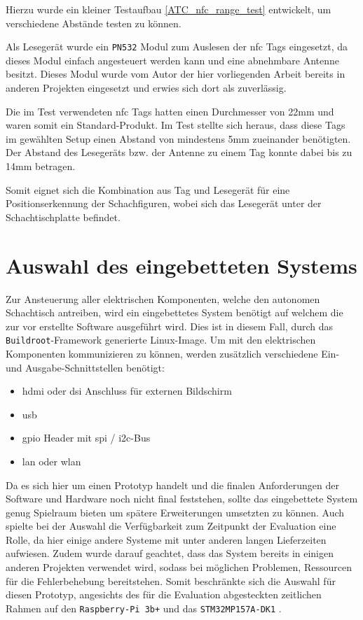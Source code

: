 Hierzu wurde ein kleiner Testaufbau \ref{ATC_nfc_range_test} entwickelt,
um verschiedene Abstände testen zu können.

Als Lesegerät wurde ein \passthrough{\lstinline!PN532!} Modul zum
Auslesen der \gls{nfc} Tags eingesetzt, da dieses Modul einfach
angesteuert werden kann und eine abnehmbare Antenne besitzt. Dieses
Modul wurde vom Autor der hier vorliegenden Arbeit bereits in anderen
Projekten eingesetzt und erwies sich dort als zuverlässig.

Die im Test verwendeten \gls{nfc} Tags hatten einen Durchmesser von 22mm
und waren somit ein Standard-Produkt. Im Test stellte sich heraus, dass
diese Tags im gewählten Setup einen Abstand von mindestens 5mm
zueinander benötigten. Der Abstand des Lesegeräts bzw. der Antenne zu
einem Tag konnte dabei bis zu 14mm betragen.

Somit eignet sich die Kombination aus Tag und Lesegerät für eine
Positionserkennung der Schachfiguren, wobei sich das Lesegerät unter der
Schachtischplatte befindet.

\hypertarget{auswahl-des-eingebetteten-systems}{%
\section{Auswahl des eingebetteten
Systems}\label{auswahl-des-eingebetteten-systems}}

Zur Ansteuerung aller elektrischen Komponenten, welche den autonomen
Schachtisch antreiben, wird ein eingebettetes System benötigt auf
welchem die zur vor erstellte Software ausgeführt wird. Dies ist in
diesem Fall, durch das \passthrough{\lstinline!Buildroot!}-Framework
generierte Linux-Image. Um mit den elektrischen Komponenten
kommunizieren zu können, werden zusätzlich verschiedene Ein- und
Ausgabe-Schnittstellen benötigt:

\begin{itemize}
\tightlist
\item
  \gls{hdmi} oder \gls{dsi} Anschluss für externen Bildschirm
\item
  \gls{usb}
\item
  \gls{gpio} Header mit \gls{spi} / \gls{i2c}-Bus
\item
  \gls{lan} oder \gls{wlan}
\end{itemize}

Da es sich hier um einen Prototyp handelt und die finalen Anforderungen
der Software und Hardware noch nicht final feststehen, sollte das
eingebettete System genug Spielraum bieten um spätere Erweiterungen
umsetzten zu können. Auch spielte bei der Auswahl die Verfügbarkeit zum
Zeitpunkt der Evaluation eine Rolle, da hier einige andere Systeme mit
unter anderen langen Lieferzeiten aufwiesen. Zudem wurde darauf
geachtet, dass das System bereits in einigen anderen Projekten verwendet
wird, sodass bei möglichen Problemen, Ressourcen für die Fehlerbehebung
bereitstehen. Somit beschränkte sich die Auswahl für diesen Prototyp,
angesichts des für die Evaluation abgesteckten zeitlichen Rahmen auf den
\passthrough{\lstinline!Raspberry-Pi 3b+!} und das
\passthrough{\lstinline!STM32MP157A-DK1!} \label{ref}.

